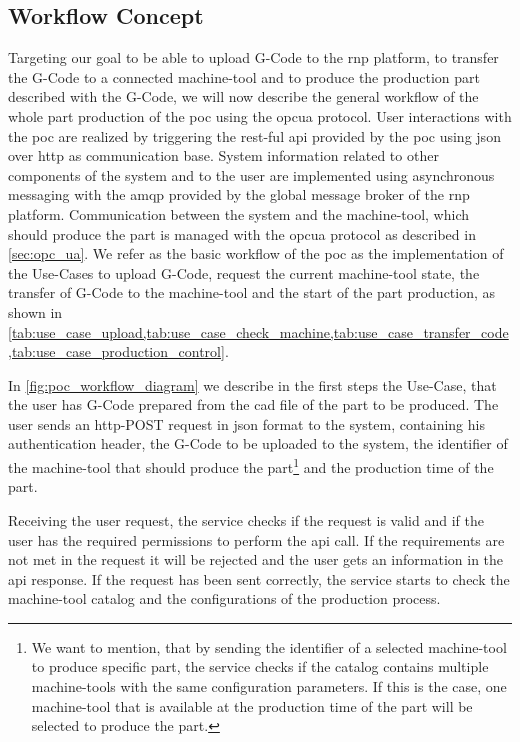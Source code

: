 \documentclass[
a4paper,
twoside,
headsepline,
cleardoublepage=empty,
parskip=half,
draft=false
]{scrbook}
\begin{document}
			\subsection{Workflow Concept} \label{subsec:workflow_concept}

				Targeting our goal to be able to upload G-Code to the \gls{rnp} platform, to transfer the G-Code to a connected machine-tool and to produce the production part described with the G-Code, we will now describe the general workflow of the whole part production of the \gls{poc} using the \gls{opcua} protocol.
				User interactions with the \gls{poc} are realized by triggering the \gls{rest}-ful \gls{api} provided by the \gls{poc} using \gls{json} over \gls{http} as communication base.
				System information related to other components of the system and to the user are implemented using asynchronous messaging with the \gls{amqp} provided by the global message broker of the \gls{rnp} platform.
				Communication between the system and the machine-tool, which should produce the part is managed with the \gls{opcua} protocol as described in \cref{sec:opc_ua}.
				We refer as the basic workflow of the \gls{poc} as the implementation of the Use-Cases to upload G-Code, request the current machine-tool state, the transfer of G-Code to the machine-tool and the start of the part production, as shown in \cref{tab:use_case_upload,tab:use_case_check_machine,tab:use_case_transfer_code,tab:use_case_production_control}.

				In \cref{fig:poc_workflow_diagram} we describe in the first steps the Use-Case, that the user has G-Code prepared from the \gls{cad} file of the part to be produced. The user sends an \gls{http}-POST request in \gls{json} format to the system, containing his authentication header, the G-Code to be uploaded to the system, the identifier of the machine-tool that should produce the part\footnote{We want to mention, that by sending the identifier of a selected machine-tool to produce specific part, the service checks if the catalog contains multiple machine-tools with the same configuration parameters. If this is the case, one machine-tool that is available at the production time of the part will be selected to produce the part.} and the production time of the part.

				Receiving the user request, the service checks if the request is valid and if the user has the required permissions to perform the \gls{api} call. If the requirements are not met in the request it will be rejected and the user gets an information in the \gls{api} response. If the request has been sent correctly, the service starts to check the machine-tool catalog and the configurations of the production process.
\end{document}
